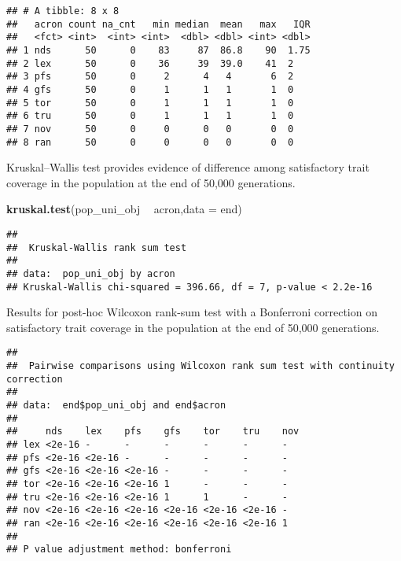 \documentclass[]{book}
\newenvironment{Shaded}{\begin{snugshade}}{\end{snugshade}}
\newcommand{\DataTypeTok}[1]{\textcolor[rgb]{0.13,0.29,0.53}{#1}}
\newcommand{\KeywordTok}[1]{\textcolor[rgb]{0.13,0.29,0.53}{\textbf{#1}}}
\newcommand{\NormalTok}[1]{#1}
\newcommand{\OperatorTok}[1]{\textcolor[rgb]{0.81,0.36,0.00}{\textbf{#1}}}
\newcommand{\OtherTok}[1]{\textcolor[rgb]{0.56,0.35,0.01}{#1}}
\newcommand{\StringTok}[1]{\textcolor[rgb]{0.31,0.60,0.02}{#1}}
\begin{document}
\begin{verbatim}
## # A tibble: 8 x 8
##   acron count na_cnt   min median  mean   max   IQR
##   <fct> <int>  <int> <int>  <dbl> <dbl> <int> <dbl>
## 1 nds      50      0    83     87  86.8    90  1.75
## 2 lex      50      0    36     39  39.0    41  2   
## 3 pfs      50      0     2      4   4       6  2   
## 4 gfs      50      0     1      1   1       1  0   
## 5 tor      50      0     1      1   1       1  0   
## 6 tru      50      0     1      1   1       1  0   
## 7 nov      50      0     0      0   0       0  0   
## 8 ran      50      0     0      0   0       0  0
\end{verbatim}

Kruskal--Wallis test provides evidence of difference among satisfactory trait coverage in the population at the end of 50,000 generations.

\begin{Shaded}
\begin{Highlighting}[]
\KeywordTok{kruskal.test}\NormalTok{(pop_uni_obj }\OperatorTok{~}\StringTok{ }\NormalTok{acron,}\DataTypeTok{data =}\NormalTok{ end)}
\end{Highlighting}
\end{Shaded}

\begin{verbatim}
## 
##  Kruskal-Wallis rank sum test
## 
## data:  pop_uni_obj by acron
## Kruskal-Wallis chi-squared = 396.66, df = 7, p-value < 2.2e-16
\end{verbatim}

Results for post-hoc Wilcoxon rank-sum test with a Bonferroni correction on satisfactory trait coverage in the population at the end of 50,000 generations.

\begin{Shaded}
\end{Shaded}

\begin{verbatim}
## 
##  Pairwise comparisons using Wilcoxon rank sum test with continuity correction 
## 
## data:  end$pop_uni_obj and end$acron 
## 
##     nds    lex    pfs    gfs    tor    tru    nov
## lex <2e-16 -      -      -      -      -      -  
## pfs <2e-16 <2e-16 -      -      -      -      -  
## gfs <2e-16 <2e-16 <2e-16 -      -      -      -  
## tor <2e-16 <2e-16 <2e-16 1      -      -      -  
## tru <2e-16 <2e-16 <2e-16 1      1      -      -  
## nov <2e-16 <2e-16 <2e-16 <2e-16 <2e-16 <2e-16 -  
## ran <2e-16 <2e-16 <2e-16 <2e-16 <2e-16 <2e-16 1  
## 
## P value adjustment method: bonferroni
\end{verbatim}
\end{document}
